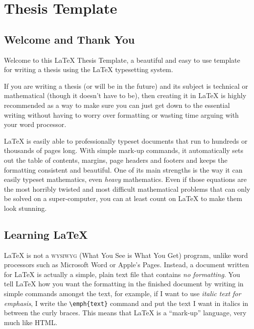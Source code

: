 \setcounter{chapter}{-1}
\chapter{Thesis Template} %

\label{Chapter0} %

\section{Welcome and Thank You}
Welcome to this \LaTeX{} Thesis Template, a beautiful and easy to use template for writing a thesis using the \LaTeX{} typesetting system.

If you are writing a thesis (or will be in the future) and its subject is
technical or mathematical (though it doesn't have to be), then creating it in
\LaTeX{} is highly recommended as a way to make sure you can just get down to
the essential writing without having to worry over formatting or wasting time
arguing with your word processor.

\LaTeX{} is easily able to professionally typeset documents that run to hundreds
or thousands of pages long. With simple mark-up commands, it automatically sets
out the table of contents, margins, page headers and footers and keeps the
formatting consistent and beautiful. One of its main strengths is the way it can
easily typeset mathematics, even \emph{heavy} mathematics. Even if those
equations are the most horribly twisted and most difficult mathematical problems
that can only be solved on a super-computer, you can at least count on \LaTeX{}
to make them look stunning.


\section{Learning \LaTeX{}}

\LaTeX{} is not a \textsc{wysiwyg} (What You See is What You Get) program, unlike word processors such as Microsoft Word or Apple's Pages. Instead, a document written for \LaTeX{} is actually a simple, plain text file that contains \emph{no formatting}. You tell \LaTeX{} how you want the formatting in the finished document by writing in simple commands amongst the text, for example, if I want to use \emph{italic text for emphasis}, I write the \verb|\emph{text}| command and put the text I want in italics in between the curly braces. This means that \LaTeX{} is a \enquote{mark-up} language, very much like HTML.

